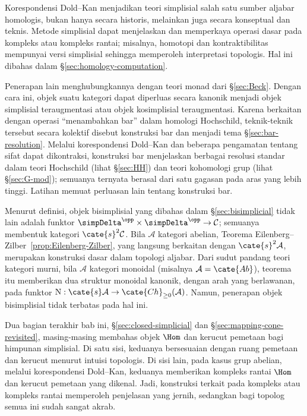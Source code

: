 Korespondensi Dold--Kan menjadikan teori simplisial salah satu sumber
aljabar homologis, bukan hanya secara historis, melainkan juga secara konseptual
dan teknis. Metode simplisial dapat menjelaskan dan memperkaya operasi
dasar pada kompleks atau kompleks rantai; misalnya, homotopi dan
kontraktibilitas mempunyai versi simplisial sehingga memperoleh
interpretasi topologis. Hal ini dibahas dalam
\S\ref{sec:homology-computation}.

Penerapan lain menghubungkannya dengan teori monad dari \S\ref{sec:Beck}.
Dengan cara ini, objek suatu kategori dapat diperluas secara kanonik menjadi objek simplisial
teraugmentasi atau objek kosimplisial teraugmentasi. Karena berkaitan dengan
operasi ``menambahkan bar'' dalam homologi Hochschild, teknik-teknik tersebut
secara kolektif disebut konstruksi bar dan menjadi tema
\S\ref{sec:bar-resolution}. Melalui korespondensi Dold--Kan dan beberapa
pengamatan tentang sifat dapat dikontraksi, konstruksi bar menjelaskan
berbagai resolusi standar dalam teori Hochschild (lihat \S\ref{sec:HH}) dan
teori kohomologi grup (lihat \S\ref{sec:G-mod}); semuanya ternyata berasal
dari satu gagasan pada aras yang lebih tinggi. Latihan memuat perluasan lain tentang
konstruksi bar.

Menurut definisi, objek bisimplisial yang dibahas dalam
\S\ref{sec:bisimplicial} tidak lain adalah funktor
$\simpDelta^{\opp}\times\simpDelta^{\opp}\to\mathcal{C}$; semuanya membentuk
kategori $\cate{s}^2\mathcal{C}$. Bila $\mathcal{A}$ kategori abelian, Teorema
Eilenberg--Zilber~\ref{prop:Eilenberg-Zilber}, yang langsung berkaitan dengan
$\cate{s}^2\mathcal{A}$, merupakan konstruksi dasar dalam topologi aljabar.
Dari sudut pandang teori kategori murni, bila $\mathcal{A}$ kategori monoidal
(misalnya $\mathcal{A}=\cate{Ab}$), teorema itu memberikan dua struktur monoidal
kanonik, dengan arah yang berlawanan, pada funktor
$\mathrm{N}:\cate{s}\mathcal{A}\to\cate{Ch}_{\geq0}(\mathcal{A})$. Namun,
penerapan objek bisimplisial tidak terbatas pada hal ini.

Dua bagian terakhir bab ini, \S\ref{sec:closed-simplicial} dan
\S\ref{sec:mapping-cone-revisited}, masing-masing membahas objek $\Hom$ dan
kerucut pemetaan bagi himpunan simplisial. Di satu sisi, keduanya
bersesuaian dengan ruang pemetaan dan kerucut menurut intuisi topologis. Di sisi
lain, pada kasus grup abelian, melalui korespondensi Dold--Kan, keduanya
memberikan kompleks rantai $\Hom$ dan kerucut pemetaan yang dikenal. Jadi,
konstruksi terkait pada kompleks atau kompleks rantai memperoleh penjelasan
yang jernih, sedangkan bagi topolog semua ini sudah sangat akrab.

